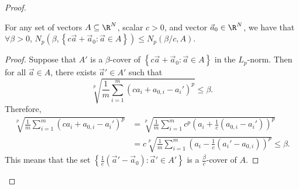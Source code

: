 \begin{proof}
\begin{lemma}\label{lemma:scale}
For any set of vectors $A \subseteq \R^N$, scalar $c > 0$, and vector $\vec{a}_0 \in \R^N$, we have that $\forall \beta > 0$, $N_p(\beta, \left\{c\vec{a} + \vec{a}_0 : \vec{a} \in A\right\}) \leq N_p(\beta/c, A)$.
\end{lemma}
\begin{proof}
Suppose that $A'$ is a $\beta$-cover of $\left\{c\vec{a} + \vec{a}_0 : \vec{a} \in A\right\}$ in the $L_p$-norm. Then for all $\vec{a} \in A$, there exists $\vec{a}' \in A'$ such that \[\sqrt[p]{\frac{1}{m}\sum_{i = 1}^m (ca_i + a_{0,i} - a_i')^p} \leq \beta.\] Therefore, \begin{align*}\sqrt[p]{\frac{1}{m}\sum_{i = 1}^m (ca_i + a_{0,i} - a_i')^p} &= \sqrt[p]{\frac{1}{m}\sum_{i = 1}^m c^p\left(a_i + \frac{1}{c}(a_{0,i} - a_i')\right)^p}\\
&= c\sqrt[p]{\frac{1}{m}\sum_{i = 1}^m \left(a_i - \frac{1}{c}(a_i' - a_{0,i})\right)^p} \leq \beta. \end{align*} This means that the set $\left\{\frac{1}{c}(\vec{a}' - \vec{a}_0) : \vec{a}' \in A'\right\}$ is a $\frac{\beta}{c}$-cover of $A$.
\end{proof}


\end{proof}
